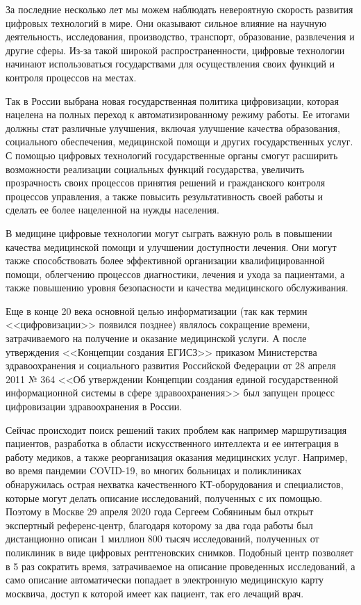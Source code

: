 \introduction %

За последние несколько лет мы можем наблюдать невероятную скорость развития цифровых технологий в мире. Они оказывают сильное влияние на научную деятельность, исследования, производство, транспорт, образование, развлечения и другие сферы. Из-за такой широкой распространенности, цифровые технологии начинают использоваться государствами для осуществления своих функций и контроля процессов на местах.

Так в России выбрана новая государственная политика цифровизации, которая нацелена на полных переход к автоматизированному режиму работы. Ее итогами должны стат различные улучшения, включая улучшение качества образования, социального обеспечения, медицинской помощи и других государственных услуг. С помощью цифровых технологий государственные органы смогут расширить возможности реализации социальных функций государства, увеличить прозрачность своих процессов принятия решений и гражданского контроля процессов управления, а также повысить результативность своей работы и сделать ее более нацеленной на нужды населения.

В медицине цифровые технологии могут сыграть важную роль в повышении качества медицинской помощи и улучшении доступности лечения. Они могут также способствовать более эффективной организации квалифицированной помощи, облегчению процессов диагностики, лечения и ухода за пациентами, а также повышению уровня безопасности и качества медицинского обслуживания.

Еще в конце 20 века основной целью информатизации (так как термин <<цифровизации>> появился позднее)  являлось сокращение времени, затрачиваемого на получение и оказание медицинской услуги. А после утверждения <<Концепции создания ЕГИСЗ>> приказом Министерства здравоохранения и социального развития Российской Федерации от 28 апреля 2011 № 364 <<Об утверждении Концепции создания единой государственной информационной системы в сфере здравоохранения>> был запущен процесс цифровизации здравоохранения в России. \cite{Концепция} \cite{ФедПроект}

Сейчас происходит поиск решений таких проблем как например маршрутизация пациентов, разработка в области искусственного интеллекта и ее интеграция в работу медиков, а также реорганизация оказания медицинских услуг. Например, во время пандемии COVID-19, во многих больницах и поликлиниках обнаружилась острая нехватка качественного КТ-оборудования и специалистов, которые могут делать описание исследований, полученных с их помощью. Поэтому в Москве 29 апреля 2020 года Сергеем Собяниным был открыт экспертный референс-центр, благодаря которому за два года работы был дистанционно описан 1 миллион 800 тысяч исследований, полученных от поликлиник в виде цифровых рентгеновских снимков. Подобный центр позволяет в 5 раз сократить время, затрачиваемое на описание проведенных исследований, а само описание автоматически попадает в электронную медицинскую карту москвича, доступ к которой имеет как пациент, так его лечащий врач. \cite{COVID}


